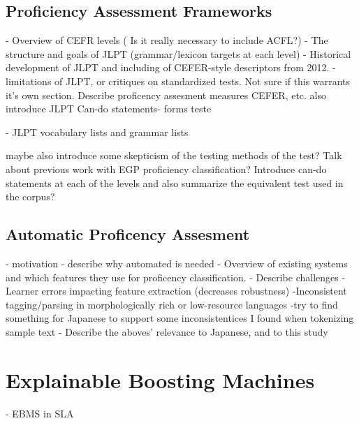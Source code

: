 \subsection{Proficiency Assessment Frameworks}
- Overview of CEFR levels ( Is it really necessary to include ACFL?)
- The structure and goals of JLPT (grammar/lexicon targets at each level)
- Historical development of JLPT and including of CEFER-style descriptors from 2012.
- limitations of JLPT, or critiques on standardized tests.
Not sure if this warrants it's own section. Describe proficency assesment measures CEFER, etc. also introduce JLPT
Can-do statements- forms teste

- JLPT vocabulary lists and grammar lists

maybe also introduce some skepticism of the testing methods of the test?
Talk about previous work with EGP proficiency classification?
Introduce can-do statements at each of the levels and also summarize the equivalent test used in the corpus?


\subsection{Automatic Proficency Assesment}
- motivation - describe why automated is needed
- Overview of existing systems and which features they use for proficency classification.
- Describe challenges
    - Learner errors impacting feature extraction (decreases robustness)
    -Inconsistent tagging/parsing in morphologically rich or low-resource languages
        -try to find something for Japanese to support some inconsistentices I found when tokenizing sample text
- Describe the aboves' relevance to Japanese, and to this study

\section{Explainable Boosting Machines}
- EBMS in SLA
\citep{akef2025}